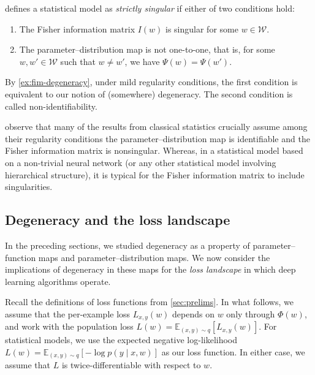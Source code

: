 \documentclass[11pt]{article}
\newcommand{\E}{\mathbb{E}}
\newcommand{\W}{\mathcal{W}}
\begin{document}
\begin{remark}
\label{rem:strictly-singular}
    \citet{Watanabe2009} defines a statistical model as \emph{strictly
    singular} if either of two conditions hold:
    \begin{enumerate}
        \item
            The Fisher information matrix $I(w)$ is singular for some $w \in \W$.
        \item
            The parameter--distribution map is not one-to-one, that is, for some $w, w' \in \W$ such that $w \neq w'$, we have $\Psi(w) = \Psi(w')$.
    \end{enumerate}
    By \cref{ex:fim-degeneracy}, under mild regularity conditions, the first
    condition is equivalent to our notion of (somewhere) degeneracy. The second
    condition is called non-identifiability.

    \citet{Watanabe2007,Watanabe2009} observe that many of the results from
    classical statistics crucially assume among their regularity conditions the
    parameter--distribution map is identifiable and the Fisher information
    matrix is nonsingular. Whereas, in a statistical model based on a
    non-trivial neural network (or any other statistical model involving
    hierarchical structure), it is typical for the Fisher information matrix to
    include singularities.
\end{remark}

\subsection{Degeneracy and the loss landscape}
\label{sec:degeneracy:hessian}

In the preceding sections, we studied degeneracy as a property of
parameter--function maps and parameter--distribution maps. We now consider the
implications of degeneracy in these maps for the \emph{loss landscape} in which
deep learning algorithms operate.

Recall the definitions of loss functions from \cref{sec:prelims}. In what
follows, we assume that the per-example loss $L_{x,y}(w)$ depends on $w$ only
through $\Phi(w)$, and work with the population loss
    $L(w) = \E_{(x,y) \sim q}[L_{x,y}(w)]$.
For statistical models,
we use the expected negative log-likelihood
    $L(w) = \E_{(x,y) \sim q}[-\log p(y \mid x, w)]$
as our loss function. In either case, we assume that $L$ is
twice-differentiable with respect to $w$.
\end{document}
